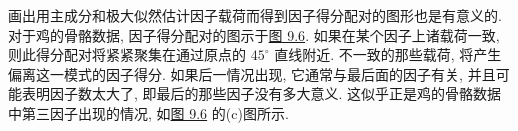 
\begin{mvfigure}
\label{fig:9.5}
\end{mvfigure}

画出用主成分和极大似然估计因子载荷而得到因子得分配对的图形也是有意义的. 对于鸡的骨骼数据, 因子得分配对的图示于\hyperref[fig:9.6]{图 9.6}. 如果在某个因子上诸载荷一致, 则此得分配对将紧紧聚集在通过原点的 $45^\circ$ 直线附近. 不一致的那些载荷, 将产生偏离这一模式的因子得分. 如果后一情况出现, 它通常与最后面的因子有关, 并且可能表明因子数太大了, 即最后的那些因子没有多大意义. 这似乎正是鸡的骨骼数据中第三因子出现的情况, 如\hyperref[fig:9.6]{图 9.6} 的(c)图所示.

\begin{mvfigure}
\label{fig:9.6}
\end{mvfigure}
